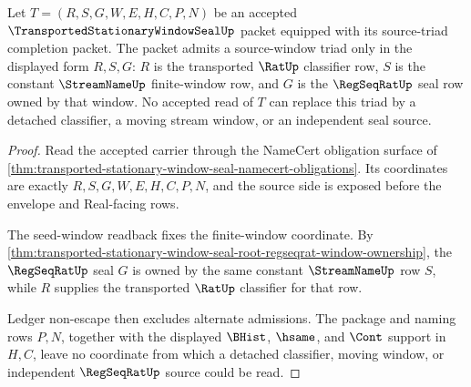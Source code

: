 \begin{theorem}
\label{thm:transported-stationary-window-seal-source-window-admission}
Let $T=(R,S,G,W,E,H,C,P,N)$ be an accepted $\TransportedStationaryWindowSealUp$ packet equipped with its source-triad completion packet. The packet admits a source-window triad only in the displayed form $R,S,G$: $R$ is the transported $\RatUp$ classifier row, $S$ is the constant $\StreamNameUp$ finite-window row, and $G$ is the $\RegSeqRatUp$ seal row owned by that window. No accepted read of $T$ can replace this triad by a detached classifier, a moving stream window, or an independent seal source.
\end{theorem}
\begin{proof}
Read the accepted carrier through the NameCert obligation surface of \autoref{thm:transported-stationary-window-seal-namecert-obligations}. Its coordinates are exactly $R,S,G,W,E,H,C,P,N$, and the source side is exposed before the envelope and Real-facing rows.

The seed-window readback fixes the finite-window coordinate. By \autoref{thm:transported-stationary-window-seal-root-regseqrat-window-ownership}, the $\RegSeqRatUp$ seal $G$ is owned by the same constant $\StreamNameUp$ row $S$, while $R$ supplies the transported $\RatUp$ classifier for that row.

Ledger non-escape then excludes alternate admissions. The package and naming rows $P,N$, together with the displayed $\BHist$, $\hsame$, and $\Cont$ support in $H,C$, leave no coordinate from which a detached classifier, moving window, or independent $\RegSeqRatUp$ source could be read.
\end{proof}

